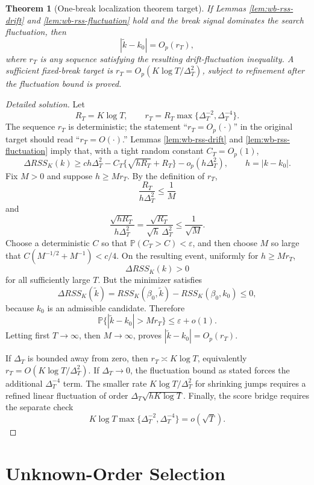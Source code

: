 \documentclass[12pt]{article}
\numberwithin{equation}{section}
\newtheorem{theorem}{Theorem}
\theoremstyle{definition}
\newcommand{\Pp}{\mathbb P}
\begin{document}
\begin{theorem}[One-break localization theorem target]
\label{thm:wb-localization}
If Lemmas \ref{lem:wb-rss-drift} and \ref{lem:wb-rss-fluctuation} hold and the break signal dominates the search fluctuation, then
\[
    |\widetilde k-k_0|=O_p(r_T),
\]
where \(r_T\) is any sequence satisfying the resulting drift-fluctuation inequality. A sufficient fixed-break target is \(r_T=O_p(K\log T/\Delta_T^2)\), subject to refinement after the fluctuation bound is proved.
\end{theorem}


\begin{proof}[Detailed solution]
Let
\[
    R_T=K\log T,
    \qquad
    r_T=R_T\max\{\Delta_T^{-2},\Delta_T^{-4}\}.
    \label{eq:sol-localization-rate}
\]
The sequence \(r_T\) is deterministic; the statement
``\(r_T=O_p(\cdot)\)'' in the original target should read
``\(r_T=O(\cdot)\).''  Lemmas \ref{lem:wb-rss-drift} and
\ref{lem:wb-rss-fluctuation} imply that, with a tight random constant
\(C_T=O_p(1)\),
\[
    \Delta RSS_K(k)
    \geq c h\Delta_T^2
      -C_T\{\sqrt{hR_T}+R_T\}
      -o_p(h\Delta_T^2),
    \qquad h=|k-k_0|.
\]
Fix \(M>0\) and suppose \(h\geq Mr_T\).  By the definition of \(r_T\),
\[
    \frac{R_T}{h\Delta_T^2}\leq\frac1M
\]
and
\[
    \frac{\sqrt{hR_T}}{h\Delta_T^2}
    =\frac{\sqrt{R_T}}{\sqrt h\,\Delta_T^2}
    \leq\frac1{\sqrt M}.
\]
Choose a deterministic \(C\) so that
\(\Pp(C_T>C)<\varepsilon\), and then choose \(M\) so large that
\(C(M^{-1/2}+M^{-1})<c/4\).  On the resulting event, uniformly for
\(h\geq Mr_T\),
\[
    \Delta RSS_K(k)>0
\]
for all sufficiently large \(T\).  But the minimizer satisfies
\[
    \Delta RSS_K(\widetilde k)
    =RSS_K(\beta_0,\widetilde k)-RSS_K(\beta_0,k_0)\leq0,
\]
because \(k_0\) is an admissible candidate.  Therefore
\[
    \Pp\{|\widetilde k-k_0|>Mr_T\}\leq\varepsilon+o(1).
\]
Letting first \(T\to\infty\), then \(M\to\infty\), proves
\(|\widetilde k-k_0|=O_p(r_T)\).

If \(\Delta_T\) is bounded away from zero, then
\(r_T\asymp K\log T\), equivalently
\(r_T=O(K\log T/\Delta_T^2)\).  If \(\Delta_T\to0\), the fluctuation bound
as stated forces the additional \(\Delta_T^{-4}\) term.  The smaller rate
\(K\log T/\Delta_T^2\) for shrinking jumps requires a refined linear
fluctuation of order
\(\Delta_T\sqrt{hK\log T}\).  Finally, the score bridge requires the separate
check
\[
    K\log T\max\{\Delta_T^{-2},\Delta_T^{-4}\}=o(\sqrt T).
\]
\end{proof}


\section{Unknown-Order Selection}
\end{document}
